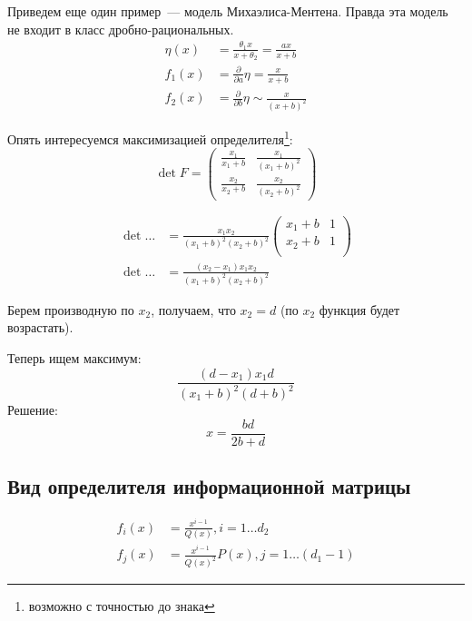 \begin{ex}
Приведем еще один пример — модель Михаэлиса-Ментена. Правда эта модель не входит в класс дробно-рациональных.
\begin{equation}
\label{michelMentenModel}
\begin{split}
\eta(x) &= \frac{\theta_1 x}{x+\theta_2} = \frac{ax}{x+b}\\
f_1(x) &= \frac{\partial}{\partial{a}}\eta=\frac{x}{x+b} \\
f_2(x) &= \frac{\partial}{\partial{b}}\eta \sim \frac{x}{(x+b)^2}
\end{split}
\end{equation}

Опять интересуемся максимизацией определителя\footnote{возможно с точностью до знака}:
\begin{equation}
\det F = \begin{pmatrix}
\frac{x_1}{x_1+b} & \frac{x_1}{(x_1+b)^2} \\
\frac{x_2}{x_2+b} & \frac{x_2}{(x_2+b)^2} 
\end{pmatrix}
\end{equation}

\begin{align}
\det … &= \frac{x_1x_2}{(x_1+b)^2(x_2+b)^2}\begin{pmatrix} 
x_1 + b & 1 \\
x_2 + b & 1 \\
\end{pmatrix}\\
\det … &= \frac{(x_2 - x_1) x_1 x_2}{(x_1 + b)^2 (x_2 + b)^2}
\end{align}

Берем производную по $x_2$, получаем, что $x_2 = d$ (по $x_2$ функция будет возрастать).

Теперь ищем максимум:
\begin{equation}
\frac{(d - x_1) x_1 d}{(x_1 + b)^2 (d + b)^2}
\end{equation}
Решение: 
$$x = \frac{bd}{2b + d}$$
\end{ex}


\subsection{Вид определителя информационной матрицы}

\begin{align}
f_i(x) &= \frac{x^{i-1}}{Q(x)}, i =1 … d_2 \\
f_{j}(x) &= \frac{x^{i-1}}{Q(x)^2}P(x), j = 1…(d_1-1)
\end{align}

